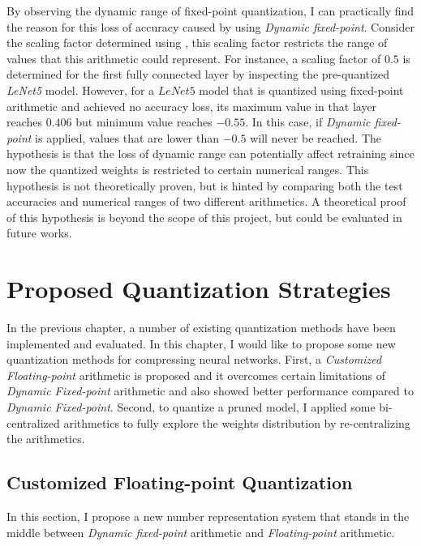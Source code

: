 \documentclass[a4paper,12pt]{report}
\begin{document}
By observing the dynamic range of fixed-point quantization, I can practically
find the reason for this loss of accuracy caused by using \textit{Dynamic fixed-point}.
Consider the scaling factor determined using , this
scaling factor restricts the range of values that this arithmetic could represent.
For instance, a scaling factor of $0.5$ is determined for the first fully
connected layer by inspecting the pre-quantized \textit{LeNet5} model.
However, for a $LeNet5$ model that is quantized using fixed-point arithmetic and
achieved no accuracy loss, its maximum value in that layer reaches $0.406$ but
minimum value reaches $-0.55$.
In this case, if \textit{Dynamic fixed-point} is applied, values that are lower
than $-0.5$ will never be reached.
The hypothesis is that the loss of dynamic range can potentially affect retraining
since now the quantized weights is restricted to certain numerical ranges.
This hypothesis is not theoretically proven, but is hinted by comparing both
the test accuracies and numerical ranges of two different arithmetics.
A theoretical proof of this hypothesis is beyond the scope of this project, but
could be evaluated in future works.

\chapter{Proposed Quantization Strategies}
In the previous chapter, a number of existing quantization methods have been
implemented and evaluated.
In this chapter, I would like to propose some new quantization methods for
compressing neural networks.
First, a \textit{Customized Floating-point} arithmetic is proposed and it overcomes
certain limitations of \textit{Dynamic Fixed-point} arithmetic and also showed
better performance compared to \textit{Dynamic Fixed-point}.
Second, to quantize a pruned model, I applied some bi-centralized arithmetics
to fully explore the weights distribution by re-centralizing the arithmetics.

\section{Customized Floating-point Quantization}
In this section, I propose a new number representation system that stands in
the middle between \textit{Dynamic fixed-point} arithmetic and
\textit{Floating-point} arithmetic.
\end{document}

